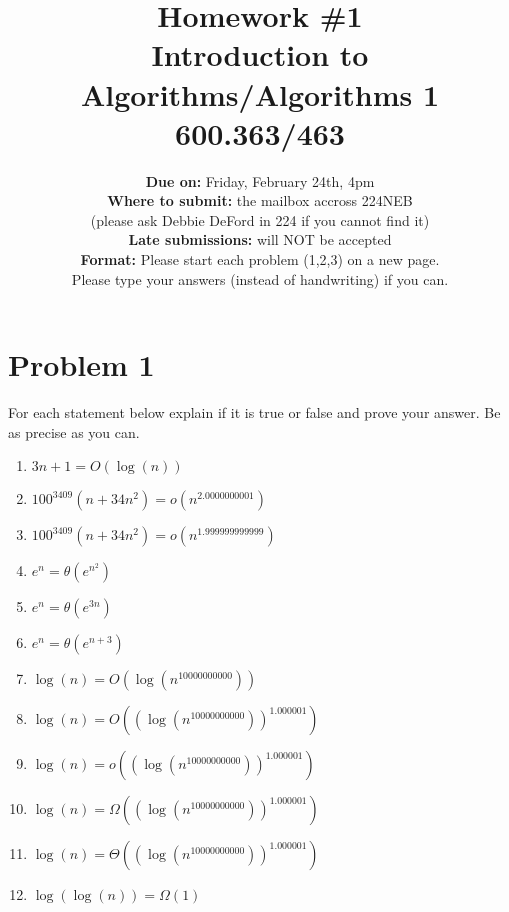 \documentclass[letterpaper, 11pt]{article}
\begin{document}
\title{Homework \#1 \\ Introduction to Algorithms/Algorithms 1 \\ 600.363/463 }
\author{\textbf{Due on:} Friday, February 24th, 4pm \\\textbf{Where to submit:} the mailbox accross 224NEB \\(please ask Debbie DeFord in 224 if you cannot find it)\\ \textbf{Late submissions:} will NOT be accepted\\
\textbf{Format:} Please start each problem (1,2,3) on a new page. \\Please type your answers (instead of handwriting) if you can.
\\}


\maketitle



\section{Problem 1}

For each statement below explain if it is true or false and prove  
your answer. Be as precise as you can.

\begin{enumerate}
\item  $3n + 1 = O(\log(n))$

\item  $100^{3409}(n+34n^2) = o(n^{2.0000000001})$


\item  $100^{3409}(n+34n^2) = o(n^{1.999999999999})$

\item $e^n = \theta(e^{n^2})$

\item $e^n = \theta(e^{3n})$

\item $e^n = \theta(e^{n+3})$


\item $\log(n) = O(\log(n^{10000000000}))$

\item $\log(n) = O(\left(\log(n^{10000000000})\right)^{1.000001})$

\item $\log(n) = o(\left(\log(n^{10000000000})\right)^{1.000001})$

\item $\log(n) = \Omega(\left(\log(n^{10000000000})\right)^{1.000001})$

\item $\log(n) = \Theta(\left(\log(n^{10000000000})\right)^{1.000001})$

\item $\log(\log(n)) = \Omega(1)$



\end{enumerate}
\end{document}

